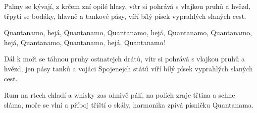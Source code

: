
\beginverse{}
Palmy se kývají, z krčem zní opilé hlasy,
vítr si pohrává s vlajkou pruhů a hvězd,
třpytí se bodáky, hlavně a tankové pásy,
víří bílý písek vyprahlých slaných cest.
\endverse{}

\beginchorus{}
Quantanamo, hejá, Quantanamo,
Quantanamo, hejá, Quantanamo,
Quantanamo, hejá, Quantanamo,
Quantanamo, hejá, Quantanamo!
\endchorus{}

\beginverse{}
Dál k moři se táhnou pruhy ostnatejch drátů,
vítr si pohrává s vlajkou pruhů a hvězd,
jen pásy tanků a vojáci Spojenejch států
víří bílý písek vyprahlých slaných cest.
\endverse{}

\beginchorus{}
\phantom{}
\endchorus{}

\beginverse{}
Rum na rtech chladí a whisky zas ohnivě pálí,
na polích zraje třtina a schne sláma,
moře se vlní a příboj tříští o skály,
harmonika zpívá písničku Quantanama.
\endverse{}

\beginchorus{}
\phantom{}
\endchorus{}

\endsong{}
